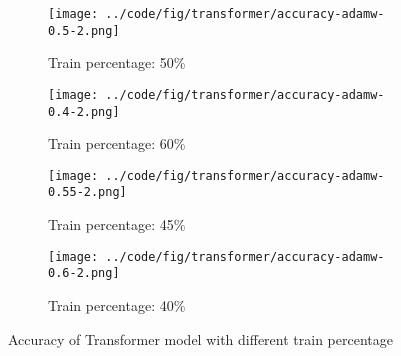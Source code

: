 \documentclass{article}
\begin{document}
\begin{figure}[ht]
    \centering
    \begin{subfigure}{0.45\textwidth}
        \texttt{[image: ../code/fig/transformer/accuracy-adamw-0.5-2.png]}
        \caption{Train percentage: 50\%}
    \end{subfigure}
    \begin{subfigure}{0.45\textwidth}
        \texttt{[image: ../code/fig/transformer/accuracy-adamw-0.4-2.png]}
        \caption{Train percentage: 60\%}
    \end{subfigure}
    \begin{subfigure}{0.45\textwidth}
        \texttt{[image: ../code/fig/transformer/accuracy-adamw-0.55-2.png]}
        \caption{Train percentage: 45\%}
    \end{subfigure}
    \begin{subfigure}{0.45\textwidth}
        \texttt{[image: ../code/fig/transformer/accuracy-adamw-0.6-2.png]}
        \caption{Train percentage: 40\%}
    \end{subfigure}
    \caption{Accuracy of Transformer model with different train percentage}
    \label{fig:transformer-accuracy-all}
\end{figure}



\end{document}
